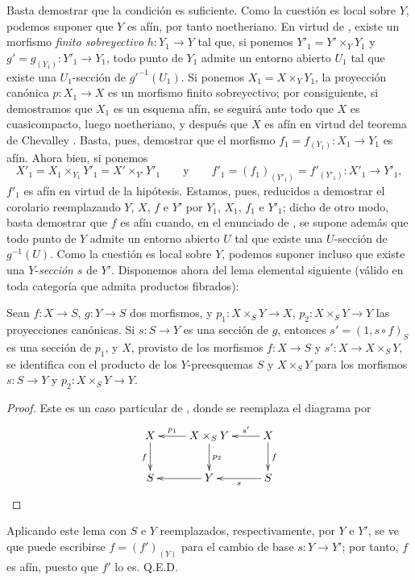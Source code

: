 Basta demostrar que la condición es suficiente.
Como la cuestión es local sobre $Y$, podemos suponer que $Y$ es afín, por tanto noetheriano.
En virtud de , existe un morfismo \emph{finito sobreyectivo} $h:Y_1\to Y$ tal que, si ponemos $Y'_1=Y'\times_Y Y_1$ y $g'=g_{(Y_1)}:Y'_1\to Y_1$, todo punto de $Y_1$ admite un entorno abierto $U_1$ tal que existe una $U_1$-sección de $g'^{-1}(U_1)$.
Si ponemos $X_1=X\times_Y Y_1$, la proyección canónica $p:X_1\to X$ es un morfismo finito sobreyectivo; por consiguiente, si demostramos que $X_1$ es un esquema afín, se seguirá ante todo que $X$ es cuasicompacto, luego noetheriano, y después que $X$ es afín en virtud del teorema de Chevalley .
Basta, pues, demostrar que el morfismo $f_1=f_{(Y_1)}:X_1\to Y_1$ es afín.
Ahora bien, si ponemos
\[
  X'_1=X_1\times_{Y_1}Y'_1=X'\times_{Y'}Y'_1 \qquad\text{y}\qquad f'_1=(f_1)_{(Y'_1)}=f'_{(Y'_1)}:X'_1\to Y'_1,
\]
$f'_1$ es afín en virtud de la hipótesis.
Estamos, pues, reducidos a demostrar el corolario reemplazando $Y$, $X$, $f$ e $Y'$ por $Y_1$, $X_1$, $f_1$ e $Y'_1$; dicho de otro modo, basta demostrar que $f$ es afín cuando, en el enunciado de , se supone además que todo punto de $Y$ admite un entorno abierto $U$ tal que existe una $U$-sección de $g^{-1}(U)$.
Como la cuestión es local sobre $Y$, podemos suponer incluso que existe una $Y$-\emph{sección} $s$ de $Y'$.
Disponemos ahora del lema elemental siguiente (válido en toda categoría que admita productos fibrados):

\begin{lemma}[14.5.11.1]
\label{IV.14.5.11.1}
Sean $f:X\to S$, $g:Y\to S$ dos morfismos, y $p_1:X\times_S Y\to X$, $p_2:X\times_S Y\to Y$ las proyecciones canónicas.
Si $s:S\to Y$ es una sección de $g$, entonces $s'=(1,s\circ f)_S$ es una sección de $p_1$, y $X$, provisto de los morfismos $f:X\to S$ y $s':X\to X\times_S Y$, se identifica con el producto de los $Y$-preesquemas $S$ y $X\times_S Y$ para los morfismos $s:S\to Y$ y $p_2:X\times_S Y\to Y$.
\end{lemma}

\begin{proof}
Este es un caso particular de , donde se reemplaza el diagrama por
\[
\xymatrix{
  X \ar[d]_f & X\times_S Y \ar[l]_-{p_1} \ar[d]^{p_2} & X \ar[l]_-{s'} \ar[d]^f \\
  S & Y \ar[l] & S \ar[l]^-{s}
}
\]
\end{proof}
\noindent Aplicando este lema con $S$ e $Y$ reemplazados, respectivamente, por $Y$ e $Y'$, se ve que puede escribirse $f=(f')_{(Y)}$ para el cambio de base $s:Y\to Y'$; por tanto, $f$ es afín, puesto que $f'$ lo es.
Q.E.D.

